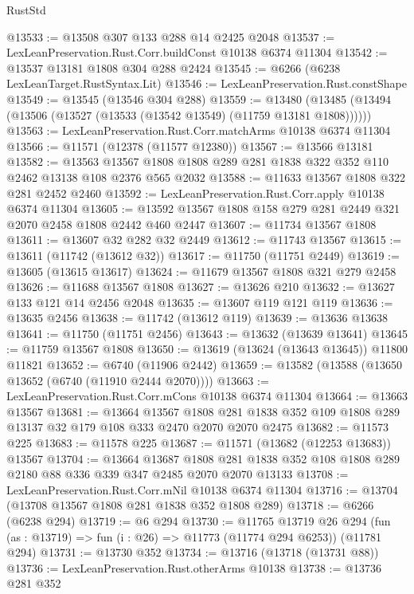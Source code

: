\begin{lexlean}{RustStd}
\begin{coremodule}
@13533 := @13508 @307 @133 @288 @14 @2425 @2048
@13537 := LexLeanPreservation.Rust.Corr.buildConst @10138 @6374 @11304
@13542 := @13537 @13181 @1808 @304 @288 @2424
@13545 := @6266 (@6238 LexLeanTarget.RustSyntax.Lit)
@13546 := LexLeanPreservation.Rust.constShape
@13549 := @13545 (@13546 @304 @288)
@13559 := @13480 (@13485 (@13494 (@13506 (@13527 (@13533 (@13542 @13549) (@11759 @13181 @1808))))))
@13563 := LexLeanPreservation.Rust.Corr.matchArms @10138 @6374 @11304
@13566 := @11571 (@12378 (@11577 @12380))
@13567 := @13566 @13181
@13582 := @13563
    @13567
    @1808
    @1808
    @289
    @281
    @1838
    @322
    @352
    @110
    @2462
    @13138
    @108
    @2376
    @565
    @2032
@13588 := @11633 @13567 @1808 @322 @281 @2452 @2460
@13592 := LexLeanPreservation.Rust.Corr.apply @10138 @6374 @11304
@13605 := @13592 @13567 @1808 @158 @279 @281 @2449 @321 @2070 @2458 @1808 @2442 @460 @2447
@13607 := @11734 @13567 @1808
@13611 := @13607 @32 @282 @32 @2449
@13612 := @11743 @13567
@13615 := @13611 (@11742 (@13612 @32))
@13617 := @11750 (@11751 @2449)
@13619 := @13605 (@13615 @13617)
@13624 := @11679 @13567 @1808 @321 @279 @2458
@13626 := @11688 @13567 @1808
@13627 := @13626 @210
@13632 := @13627 @133 @121 @14 @2456 @2048
@13635 := @13607 @119 @121 @119
@13636 := @13635 @2456
@13638 := @11742 (@13612 @119)
@13639 := @13636 @13638
@13641 := @11750 (@11751 @2456)
@13643 := @13632 (@13639 @13641)
@13645 := @11759 @13567 @1808
@13650 := @13619 (@13624 (@13643 @13645)) @11800 @11821
@13652 := @6740 (@11906 @2442)
@13659 := @13582 (@13588 (@13650 @13652 (@6740 (@11910 @2444 @2070))))
@13663 := LexLeanPreservation.Rust.Corr.mCons @10138 @6374 @11304
@13664 := @13663 @13567
@13681 := @13664
    @13567
    @1808
    @281
    @1838
    @352
    @109
    @1808
    @289
    @13137
    @32
    @179
    @108
    @333
    @2470
    @2070
    @2070
    @2475
@13682 := @11573 @225
@13683 := @11578 @225
@13687 := @11571 (@13682 (@12253 @13683)) @13567
@13704 := @13664
    @13687
    @1808
    @281
    @1838
    @352
    @108
    @1808
    @289
    @2180
    @88
    @336
    @339
    @347
    @2485
    @2070
    @2070
    @13133
@13708 := LexLeanPreservation.Rust.Corr.mNil @10138 @6374 @11304
@13716 := @13704 (@13708 @13567 @1808 @281 @1838 @352 @1808 @289)
@13718 := @6266 (@6238 @294)
@13719 := @6 @294
@13730 := @11765
    @13719
    @26
    @294
    (fun (as : @13719) => fun (i : @26) => @11773 (@11774 @294 @6253))
    (@11781 @294)
@13731 := @13730 @352
@13734 := @13716 (@13718 (@13731 @88))
@13736 := LexLeanPreservation.Rust.otherArms @10138
@13738 := @13736 @281 @352

\end{coremodule}
\end{lexlean}
